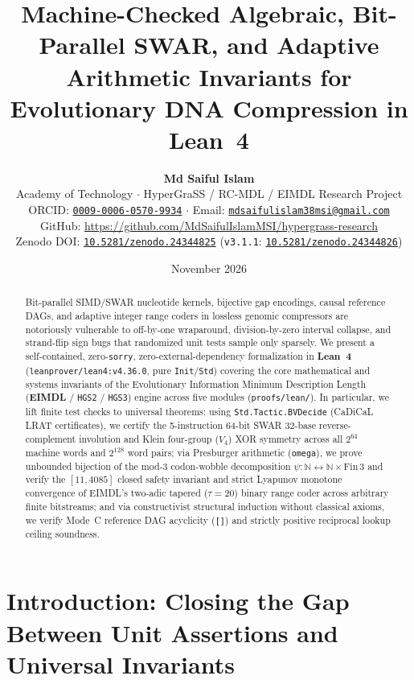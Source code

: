 \documentclass[10pt]{article}
\title{\textbf{Machine-Checked Algebraic, Bit-Parallel SWAR, and Adaptive\\
Arithmetic Invariants for Evolutionary DNA Compression in Lean~4}}
\author{
  \textbf{Md Saiful Islam}\\
  Academy of Technology $\cdot$ HyperGraSS / RC-MDL / EIMDL Research Project\\
  {\small ORCID: \href{https://orcid.org/0009-0006-0570-9934}{\texttt{0009-0006-0570-9934}} $\cdot$ Email: \href{mailto:mdsaifulislam38msi@gmail.com}{\texttt{mdsaifulislam38msi@gmail.com}}}\\
  {\small GitHub: \url{https://github.com/MdSaifulIslamMSI/hypergrass-research}}\\
  {\small Zenodo DOI: \href{https://doi.org/10.5281/zenodo.24344825}{\texttt{10.5281/zenodo.24344825}} (\texttt{v3.1.1}: \href{https://doi.org/10.5281/zenodo.24344826}{\texttt{10.5281/zenodo.24344826}})}
}
\date{November 2026}
\begin{document}
\maketitle

\begin{abstract}
\noindent
Bit-parallel SIMD/SWAR nucleotide kernels, bijective gap encodings, causal reference DAGs, and adaptive integer range coders in lossless genomic compressors are notoriously vulnerable to off-by-one wraparound, division-by-zero interval collapse, and strand-flip sign bugs that randomized unit tests sample only sparsely. We present a self-contained, zero-\texttt{sorry}, zero-external-dependency formalization in \textbf{Lean~4} (\texttt{leanprover/lean4:v4.36.0}, pure \texttt{Init}/\texttt{Std}) covering the core mathematical and systems invariants of the Evolutionary Information Minimum Description Length (\textbf{EIMDL} / \texttt{HGS2} / \texttt{HGS3}) engine across five modules (\texttt{proofs/lean/}). In particular, we lift finite test checks to universal theorems: using \texttt{Std.Tactic.BVDecide} (CaDiCaL LRAT certificates), we certify the 5-instruction 64-bit SWAR 32-base reverse-complement involution and Klein four-group ($V_4$) XOR symmetry across all $2^{64}$ machine words and $2^{128}$ word pairs; via Presburger arithmetic (\texttt{omega}), we prove unbounded bijection of the mod-3 codon-wobble decomposition $\psi: \mathbb{N} \leftrightarrow \mathbb{N} \times \mathrm{Fin}\,3$ and verify the $[11, 4085]$ closed safety invariant and strict Lyapunov monotone convergence of EIMDL's two-adic tapered ($\tau=20$) binary range coder across arbitrary finite bitstreams; and via constructivist structural induction without classical axioms, we verify Mode~C reference DAG acyclicity (\texttt{[]}) and strictly positive reciprocal lookup ceiling soundness.
\end{abstract}

\section{Introduction: Closing the Gap Between Unit Assertions and Universal Invariants}
\end{document}
